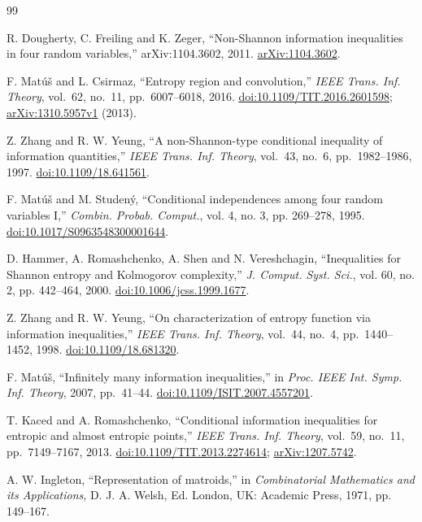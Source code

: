 \documentclass[a4paper,11pt]{article}
\begin{document}
\begin{thebibliography}{99}\footnotesize\raggedright\setlength{\itemsep}{0pt}
R. Dougherty, C. Freiling and K. Zeger,
``Non-Shannon information inequalities in four random variables,''
arXiv:1104.3602, 2011.
\href{https://arxiv.org/abs/1104.3602}{arXiv:1104.3602}.

F. Mat\'u\v{s} and L. Csirmaz, ``Entropy region and convolution,''
\emph{IEEE Trans. Inf. Theory}, vol.~62, no.~11, pp.~6007--6018, 2016.
\href{https://doi.org/10.1109/TIT.2016.2601598}{doi:10.1109/TIT.2016.2601598};
\href{https://arxiv.org/abs/1310.5957v1}{arXiv:1310.5957v1} (2013).

Z. Zhang and R. W. Yeung,
``A non-Shannon-type conditional inequality of information quantities,''
\emph{IEEE Trans. Inf. Theory}, vol.~43, no.~6, pp.~1982--1986, 1997.
\href{https://doi.org/10.1109/18.641561}{doi:10.1109/18.641561}.

F. Mat\'u\v{s} and M. Studen\'y, ``Conditional independences among four random
variables I,'' \emph{Combin. Probab. Comput.}, vol. 4,
no. 3, pp. 269--278, 1995.
\href{https://doi.org/10.1017/S0963548300001644}{doi:10.1017/S0963548300001644}.

D. Hammer, A. Romashchenko, A. Shen and N. Vereshchagin,
``Inequalities for Shannon entropy and Kolmogorov complexity,''
\emph{J. Comput. Syst. Sci.}, vol. 60, no. 2,
pp. 442--464, 2000.
\href{https://doi.org/10.1006/jcss.1999.1677}{doi:10.1006/jcss.1999.1677}.

Z. Zhang and R. W. Yeung,
``On characterization of entropy function via information inequalities,''
\emph{IEEE Trans. Inf. Theory}, vol.~44, no.~4, pp.~1440--1452, 1998.
\href{https://doi.org/10.1109/18.681320}{doi:10.1109/18.681320}.

F. Mat\'u\v{s}, ``Infinitely many information inequalities,''
in \emph{Proc. IEEE Int. Symp. Inf. Theory}, 2007, pp.~41--44.
\href{https://doi.org/10.1109/ISIT.2007.4557201}{doi:10.1109/ISIT.2007.4557201}.

T. Kaced and A. Romashchenko,
``Conditional information inequalities for entropic and almost entropic points,''
\emph{IEEE Trans. Inf. Theory}, vol.~59, no.~11, pp.~7149--7167, 2013.
\href{https://doi.org/10.1109/TIT.2013.2274614}{doi:10.1109/TIT.2013.2274614};
\href{https://arxiv.org/abs/1207.5742}{arXiv:1207.5742}.

A. W. Ingleton, ``Representation of matroids,'' in
\emph{Combinatorial Mathematics and its Applications}, D. J. A. Welsh, Ed.
London, UK: Academic Press, 1971, pp. 149--167.


\end{thebibliography}
\end{document}
